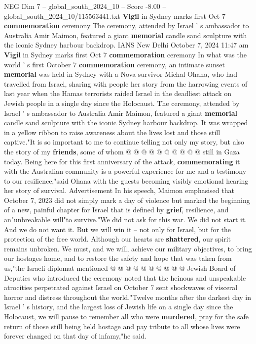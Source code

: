 \begin{textsample}{NEG Dim 7 – global\_south\_2024\_10 – Score -8.00 – global\_south\_2024\_10/115563441.txt}  \label{ex:f7_neg_242}
\textbf{Vigil} in Sydney marks first Oct 7 \textbf{commemoration} ceremony The ceremony, attended by Israel ' s ambassador to Australia Amir Maimon, featured a giant \textbf{memorial} candle sand sculpture with the iconic Sydney harbour backdrop.
IANS New Delhi October 7, 2024 11:47 am \textbf{Vigil} in Sydney marks first Oct 7 \textbf{commemoration} ceremony In what was the world ' s first October 7 \textbf{commemoration} ceremony, an intimate sunset \textbf{memorial} was held in Sydney with a Nova survivor Michal Ohana, who had travelled from Israel, sharing with people her story from the harrowing events of last year when the Hamas terrorists raided Israel in the deadliest attack on Jewish people in a single day since the Holocaust.
The ceremony, attended by Israel ' s ambassador to Australia Amir Maimon, featured a giant \textbf{memorial} candle sand sculpture with the iconic Sydney harbour backdrop.
It was wrapped in a yellow ribbon to raise awareness about the lives lost and those still captive."It is so important to me to continue telling not only my story, but also the story of my \textbf{friends}, some of whom @ @ @ @ @ @ @ @ @ @ still in Gaza today.
Being here for this first anniversary of the attack, \textbf{commemorating} it with the Australian community is a powerful experience for me and a testimony to our resilience,"said Ohana with the guests becoming visibly emotional hearing her story of survival.
Advertisement In his speech, Maimon emphasised that October 7, 2023 did not simply mark a day of violence but marked the beginning of a new, painful chapter for Israel that is defined by \textbf{grief}, resilience, and an"unbreakable will"to survive."We did not ask for this war.
We did not start it.
And we do not want it.
But we will win it -- not only for Israel, but for the protection of the free world.
Although our hearts are \textbf{shattered}, our spirit remains unbroken.
We must, and we will, achieve our military objectives, to bring our hostages home, and to restore the safety and hope that was taken from us,"the Israeli diplomat mentioned @ @ @ @ @ @ @ @ @ @ Jewish Board of Deputies who introduced the ceremony noted that the heinous and unspeakable atrocities perpetrated against Israel on October 7 sent shockwaves of visceral horror and distress throughout the world."Twelve months after the darkest day in Israel ' s history, and the largest loss of Jewish life on a single day since the Holocaust, we will pause to remember all who were \textbf{murdered}, pray for the safe return of those still being held hostage and pay tribute to all whose lives were forever changed on that day of infamy,"he said.

\end{textsample}
